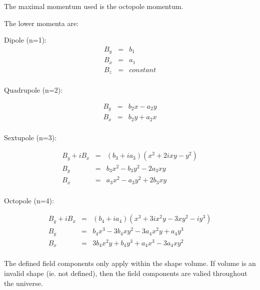 The maximal momentum used is the octopole momentum.

The lower momenta are\+:

\begin{DoxyItemize}
\item Dipole (n=1)\+: \begin{eqnarray*} B_y &=& b_1 \\ B_x &=& a_1 \\ B_z &=& constant \\ \end{eqnarray*}\end{DoxyItemize}
\begin{DoxyItemize}
\item Quadrupole (n=2)\+:\end{DoxyItemize}
\begin{eqnarray*} B_y &=& b_2 x - a_2 y \\ B_x &=& b_2 y + a_2 x \\ \end{eqnarray*}

\begin{DoxyItemize}
\item Sextupole (n=3)\+:\end{DoxyItemize}
\begin{eqnarray*} B_y + i B_x &=& (b_3 +ia_3) (x^2 + 2ixy - y^2) \\ B_y &=& b_3 x^2 - b_3 y^2 - 2 a_3 xy \\ B_x &=& a_3 x^2 - a_3 y^2 + 2 b_3 xy \\ \end{eqnarray*}

\begin{DoxyItemize}
\item Octopole (n=4)\+:\end{DoxyItemize}
\begin{eqnarray*} B_y + i B_x &=& (b_4 +ia_4) (x^3 + 3ix^2y - 3xy^2 -iy^3) \\ B_y &=& b_4 x^3 - 3 b_4 x y^2 - 3 a_4 x^2 y + a_4 y^3 \\ B_x &=& 3 b_4 x^2 y + b_4 y^3 + a_4 x^3 - 3 a_4 x y^2 \\ \end{eqnarray*}

The defined field components only apply within the shape \textquotesingle{}volume\textquotesingle{}. If \textquotesingle{}volume\textquotesingle{} is an invalid shape (ie. not defined), then the field components are valied throughout the \textquotesingle{}universe\textquotesingle{}.


